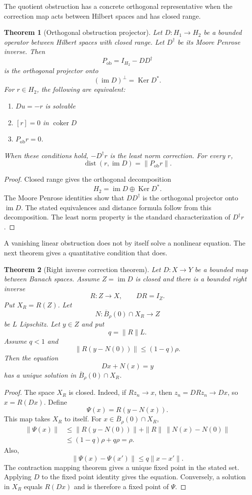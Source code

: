 \documentclass{aomart}
\newtheorem{theorem}{Theorem}[section]
\theoremstyle{definition}
\theoremstyle{remark}
\newcommand{\im}{\operatorname{im}}
\newcommand{\Ker}{\operatorname{Ker}}
\newcommand{\coker}{\operatorname{coker}}
\newcommand{\dist}{\operatorname{dist}}
\begin{document}
The quotient obstruction has a concrete orthogonal representative when the correction map acts between Hilbert spaces and has closed range.

\begin{theorem}[Orthogonal obstruction projector]\label{thm:orthogonal_obstruction}
Let $D:H_1\to H_2$ be a bounded operator between Hilbert spaces with closed range.  Let $D^\dagger$ be its Moore Penrose inverse.  Then
\[
P_{\mathrm{ob}}=I_{H_2}-DD^\dagger
\]
is the orthogonal projector onto
\[
(\im D)^\perp=\Ker D^*.
\]
For $r\in H_2$, the following are equivalent:
\begin{enumerate}
\item $Du=-r$ is solvable
\item $[r]=0$ in $\coker D$
\item $P_{\mathrm{ob}}r=0$.
\end{enumerate}
When these conditions hold, $-D^\dagger r$ is the least norm correction.  For every $r$,
\[
\dist(r,\im D)=\|P_{\mathrm{ob}}r\|.
\]
\end{theorem}

\begin{proof}
Closed range gives the orthogonal decomposition
\[
H_2=\im D\oplus\Ker D^*.
\]
The Moore Penrose identities show that $DD^\dagger$ is the orthogonal projector onto $\im D$.  The stated equivalences and distance formula follow from this decomposition.  The least norm property is the standard characterization of $D^\dagger r$.
\end{proof}

A vanishing linear obstruction does not by itself solve a nonlinear equation.  The next theorem gives a quantitative condition that does.

\begin{theorem}[Right inverse correction theorem]\label{thm:right_inverse_correction}
Let $D:X\to Y$ be a bounded map between Banach spaces.  Assume $Z=\im D$ is closed and there is a bounded right inverse
\[
R:Z\longrightarrow X,
\qquad
DR=I_Z.
\]
Put $X_R=R(Z)$.  Let
\[
N:\overline B_\rho(0)\cap X_R\longrightarrow Z
\]
be $L$ Lipschitz.  Let $y\in Z$ and put
\[
q=\|R\|L.
\]
Assume $q<1$ and
\[
\|R(y-N(0))\|
\le
(1-q)\rho.
\]
Then the equation
\[
Dx+N(x)=y
\]
has a unique solution in $\overline B_\rho(0)\cap X_R$.
\end{theorem}

\begin{proof}
The space $X_R$ is closed.  Indeed, if $Rz_n\to x$, then $z_n=DRz_n\to Dx$, so $x=R(Dx)$.  Define
\[
\Psi(x)=R(y-N(x)).
\]
This map takes $X_R$ to itself.  For $x\in\overline B_\rho(0)\cap X_R$,
\[
\begin{aligned}
\|\Psi(x)\|
&\le
\|R(y-N(0))\|
+
\|R\|\,\|N(x)-N(0)\|\\
&\le
(1-q)\rho+q\rho
=\rho.
\end{aligned}
\]
Also,
\[
\|\Psi(x)-\Psi(x')\|
\le q\|x-x'\|.
\]
The contraction mapping theorem gives a unique fixed point in the stated set.  Applying $D$ to the fixed point identity gives the equation.  Conversely, a solution in $X_R$ equals $R(Dx)$ and is therefore a fixed point of $\Psi$.
\end{proof}
\end{document}
